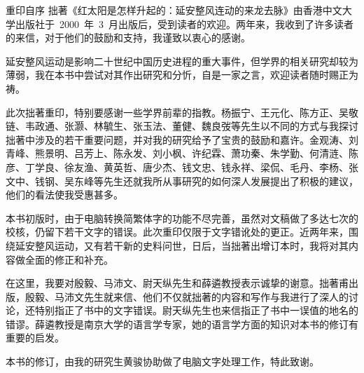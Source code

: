 \begin{pre-post-text}{重印自序}
拙著《红太阳是怎样升起的：延安整风连动的来龙去脉》由香港中文大学出版社于~2000~年~3~月出版后，受到读者的欢迎。两年来，我收到了许多读者的来信，对于他们的鼓励和支持，我谨致以衷心的感谢。

延安整风运动是影响二十世纪中国历史进程的重大事件，但学界的相关研究却较为薄弱，我在本书中尝试对其作出研究和分忻，自是一家之言，欢迎读者随时赐正为祷。

此次拙著重印，特别要感谢一些学界前辈的指教。杨振宁、王元化、陈方正、吴敬链、韦政通、张灏、林毓生、张玉法、董健、魏良弢等先生以不同的方式与我探讨拙著中涉及的若干重要问题，并对我的研究给予了宝贵的鼓励和嘉许。金观涛、刘青峰、熊景明、吕芳上、陈永发、刘小枫、许纪霖、萧功秦、朱学勤、何清涟、陈彦、丁学良、徐友渔、黄英哲、唐少杰、钱文忠、钱永祥、梁侃、毛丹、李杨、张文中、钱钢、吴东峰等先生还就我所从事研究的如何深人发展提出了积极的建议，他们的看法使我受惠甚多。

本书初版时，由于电脑转换简繁体字的功能不尽完善，虽然对文稿做了多达七次的校核，仍留下若干文字的错误。此次重印仅限于文字错讹处的更正。近两年来，围绕延安整风运动，又有若干新的史料问世，日后，当拙著出增订本时，我将对其内容做全面的修正和补充。

在这里，我要对殷毅、马沛文、尉天纵先生和薛遴教授表示诚挚的谢意。拙著甫出版，殷毅、马沛文先生就来信、他们不仅就拙著的内容和写作与我进行了深人的讨论，还特别指正了书中的文字错误。尉天纵先生也来信指正了书中一误值的地名的错谬。薛遴教授是南京大学的语言学专家，她的语言学方面的知识对本书的修订有重要的启发。

本书的修订，由我的研究生黄骏协助做了电脑文字处理工作，特此致谢。

\end{pre-post-text}
